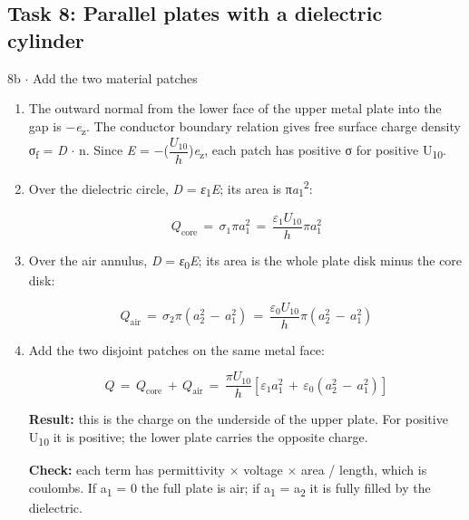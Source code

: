 \documentclass[11pt]{article}
\begin{document}
\begin{keepsection}\subsection{Task 8: Parallel plates with a dielectric cylinder}

\begin{workedbox}{8b \ensuremath{\cdot} Add the two material patches}
\begin{enumerate}
\item The outward normal from the lower face of the upper metal plate into the gap is \ensuremath{-}\textit{e}\textsubscript{z}. The conductor boundary relation gives free surface charge density σ\textsubscript{f} = \textit{D} \ensuremath{\cdot} n. Since \textit{E} = \ensuremath{-}({\small\ensuremath{\dfrac{{U}_{10}}{{h}}}})\textit{e}\textsubscript{z}, each patch has positive σ for positive U\textsubscript{10}.
\item {}
Over the dielectric circle, \textit{D} = \textit{ε}\textsubscript{1}\textit{E}; its area is π\textit{a}\textsubscript{1}\textsuperscript{2}:

\begin{equation*}{Q}_{\text{core}}\, =\, σ_{1}π{a}_{1}^{2}\, =\, \dfrac{{ε}_{1}{U}_{10}}{{h}}π{a}_{1}^{2}\end{equation*}
\item {}
Over the air annulus, \textit{D} = \textit{ε}\textsubscript{0}\textit{E}; its area is the whole plate disk minus the core disk:

\begin{equation*}{Q}_{\text{air}}\, =\, σ_{2}π({a}_{2}^{2}\, -\, {a}_{1}^{2})\, =\, \dfrac{{ε}_{0}{U}_{10}}{{h}}π({a}_{2}^{2}\, -\, {a}_{1}^{2})\end{equation*}
\item {}
Add the two disjoint patches on the same metal face:

\begin{equation*}{Q}\, =\, {Q}_{\text{core}}\, +\, {Q}_{\text{air}}\, =\, \dfrac{{πU}_{10}}{{h}}[{ε}_{1}{a}_{1}^{2}\, +\, {ε}_{0}({a}_{2}^{2}\, -\, {a}_{1}^{2})]\end{equation*}

\textbf{Result:} this is the charge on the underside of the upper plate. For positive U\textsubscript{10} it is positive; the lower plate carries the opposite charge.

\textbf{Check:} each term has permittivity \ensuremath{\times} voltage \ensuremath{\times} area / length, which is coulombs. If a\textsubscript{1} = 0 the full plate is air; if a\textsubscript{1} = a\textsubscript{2} it is fully filled by the dielectric.
\end{enumerate}
\end{workedbox}

\end{keepsection}
\end{document}
